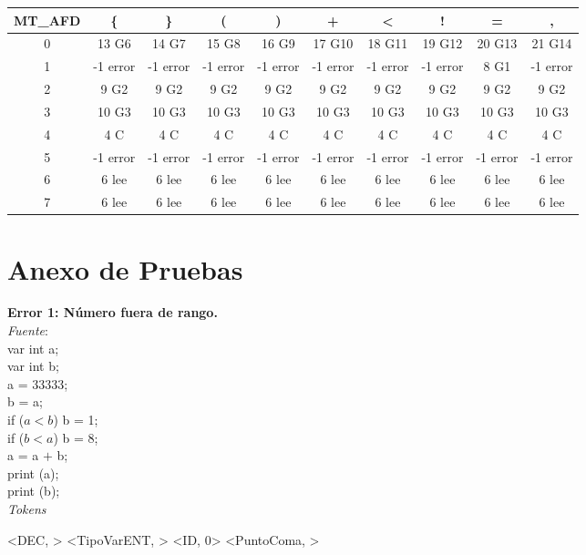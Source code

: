 \documentclass{article}
\begin{document}
\hspace*{-80pt} \begin{tabular}{|c|c|c|c|c|c|c|c|c|c|}
\hline
    \textbf{MT\_AFD}     & \textbf{\{}     & \textbf{\}}     & \textbf{(}     & \textbf{)}     & \textbf{+}     & \textbf{\textless}     & \textbf{!}     & \textbf{=}     & \textbf{,} \\
\hline
    0 & 13 G6 & 14 G7 & 15 G8 & 16 G9 & 17 G10 & 18 G11 & 19 G12 & 20 G13 & 21 G14 \\
\hline
    1 & -1 error & -1 error & -1 error & -1 error & -1 error & -1 error & -1 error & 8 G1  & -1 error \\
\hline
    2 & 9 G2  & 9 G2  & 9 G2  & 9 G2  & 9 G2  & 9 G2  & 9 G2  & 9 G2  & 9 G2 \\
\hline
    3 & 10 G3 & 10 G3 & 10 G3 & 10 G3 & 10 G3 & 10 G3 & 10 G3 & 10 G3 & 10 G3 \\
\hline
    4 & 4 C   & 4 C   & 4 C   & 4 C   & 4 C   & 4 C   & 4 C   & 4 C   & 4 C \\
\hline
    5 & -1 error & -1 error & -1 error & -1 error & -1 error & -1 error & -1 error & -1 error & -1 error \\
\hline
    6 & 6 lee & 6 lee & 6 lee & 6 lee & 6 lee & 6 lee & 6 lee & 6 lee & 6 lee \\
\hline
    7 & 6 lee & 6 lee & 6 lee & 6 lee & 6 lee & 6 lee & 6 lee & 6 lee & 6 lee \\
\hline
    \end{tabular}\hspace{-80pt}

\newpage

\section*{Anexo de Pruebas}

\textbf{Error 1: Número fuera de rango.} \\ 
\emph{Fuente}: \\
var int a; \\
var int b;\\
a = 33333;\\
b = a;\\
 if ($a  <  b$) b  =  1; \\
if ($b  <  a$) b  =  8;\\
 a = a  $+$  b;\\
print (a);\\
print (b);\medskip\\
\emph{Tokens} 

\< \> 
 <DEC, > 
 <TipoVarENT, > 
 <ID, 0> 
 <PuntoComa, > 
 
\end{document}
